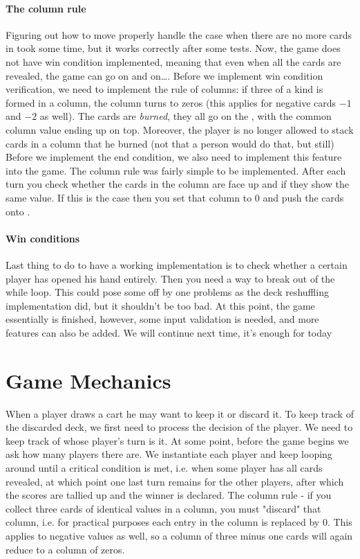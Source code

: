 \documentclass[11pt]{article}
\newcommand\dd[2]{\texttt{\detokenize{#1}} #2}
\begin{document}
\paragraph{The column rule}
Figuring out how to move properly handle the case when there are no more cards in \dd{deck_pile} took some time, 
but it works correctly after some tests. Now, the game does not have win condition implemented, meaning that 
even when all the cards are revealed, the game can go on and on\dots. Before we implement win condition verification, 
we need to implement the rule of columns: if three of a kind is formed in a column, the column turns to zeros (this applies for negative cards $-1$ and $-2$ as well).
The cards are \textit{burned}, they all go on the \dd{deck_pile}, with the common column value ending up on top. Moreover,
the player is no longer allowed to stack cards in a column that he burned (not that a person would do that, but still)
Before we implement the end condition, we also need to implement this feature into the game. 
The column rule was fairly simple to be implemented. After each turn you check whether 
the cards in the column are face up and if they show the same value. If this is the case then you set that column to $0$ 
and push the cards onto \dd{deck_pile}.

\paragraph{Win conditions}
Last thing to do to have a working implementation is to check whether a certain player has opened his hand entirely.
Then you need a way to break out of the while loop. This could pose some off by one problems as the deck reshuffling 
implementation did, but it shouldn't be too bad. At this point, the game essentially is finished, however, some input 
validation is needed, and more features can also be added. We will continue next time, it's enough for today \dd{:-)}

\section{Game Mechanics}

When a player draws a cart he may want to keep it or discard it.
To keep track of the discarded deck, we first need to process the 
decision of the player. We need to keep track of whose player's turn is it.
At some point, before the game begins we ask how many players there are.
We instantiate each player and keep looping around until a critical condition is met,
i.e. when some player has all cards revealed, at which point one last turn remains 
for the other players, after which the scores are tallied up and the winner is declared. 
The column rule - if you collect three cards of identical values in a column, you must 
"discard" that column, i.e. for practical purposes each entry in the column is replaced by 0.
This applies to negative values as well, so a column of three minus one cards will again 
reduce to a column of zeros.
\end{document}
